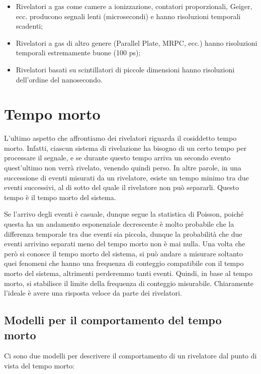 \begin{itemize}
   \item Rivelatori a gas come camere a ionizzazione, contatori proporzionali, Geiger, ecc. producono segnali lenti (microsecondi) e hanno risoluzioni temporali scadenti;
   \item Rivelatori a gas di altro genere (Parallel Plate, MRPC, ecc.) hanno risoluzioni temporali estremamente buone (100 ps);
   \item Rivelatori basati su scintillatori di piccole dimensioni hanno risoluzioni dell'ordine del nanosecondo.
\end{itemize}

\section{Tempo morto}
L'ultimo aspetto che affrontiamo dei rivelatori riguarda il cosiddetto tempo morto. Infatti, ciascun sistema di rivelazione ha bisogno di un certo tempo per processare il segnale, e se durante questo tempo arriva un secondo evento quest'ultimo non verrà rivelato, venendo quindi perso. In altre parole, in una successione di eventi misurati da un rivelatore, esiste un tempo minimo tra due eventi successivi, al di sotto del quale il rivelatore non può separarli. Questo tempo è il tempo morto del sistema.

Se l'arrivo degli eventi è casuale, dunque segue la statistica di Poisson, poiché questa ha un andamento esponenziale decrescente è molto probabile che la differenza temporale tra due eventi sia piccola, dunque la probabilità che due eventi arrivino separati meno del tempo morto non è mai nulla. Una volta che però si conosce il tempo morto del sistema, si può andare a misurare soltanto quei fenomeni che hanno una frequenza di conteggio compatibile con il tempo morto del sistema, altrimenti perderemmo tanti eventi. Quindi, in base al tempo morto, si stabilisce il limite della frequenza di conteggio misurabile. Chiaramente l'ideale è avere una risposta veloce da parte dei rivelatori.

\subsection{Modelli per il comportamento del tempo morto}

Ci sono due modelli per descrivere il comportamento di un rivelatore dal punto di vista del tempo morto:

